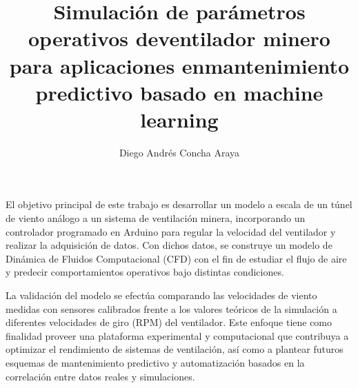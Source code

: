 \documentclass{auxiliares/umemoria}
\author{Diego Andrés Concha Araya} %
\title{Simulación de parámetros operativos de{\vspace{1.5ex}\break}ventilador minero para aplicaciones en{\vspace{1.5ex}\break}mantenimiento predictivo basado en machine learning}  %
\begin{document}
\onehalfspacing
\frontmatter
\maketitle
\begin{resumen}

  El objetivo principal de este trabajo es desarrollar un modelo a escala de un túnel de viento análogo a un sistema de ventilación minera, incorporando un controlador programado en Arduino para regular la velocidad del ventilador y realizar la adquisición de datos. Con dichos datos, se construye un modelo de Dinámica de Fluidos Computacional (CFD) con el fin de estudiar el flujo de aire y predecir comportamientos operativos bajo distintas condiciones.

  La validación del modelo se efectúa comparando las velocidades de viento medidas con sensores calibrados frente a los valores teóricos de la simulación a diferentes velocidades de giro (RPM) del ventilador. Este enfoque tiene como finalidad proveer una plataforma experimental y computacional que contribuya a optimizar el rendimiento de sistemas de ventilación, así como a plantear futuros esquemas de mantenimiento predictivo y automatización basados en la correlación entre datos reales y simulaciones.
\end{resumen}
\end{document}
